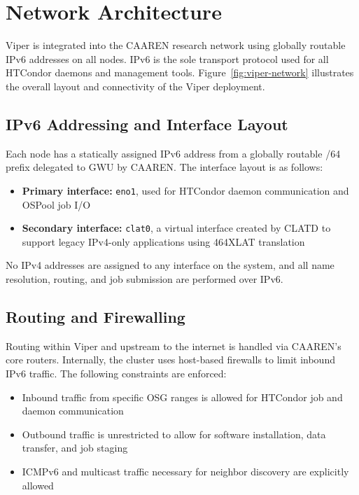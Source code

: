 \documentclass[11pt]{article}
\begin{document}


\section{Network Architecture}

Viper is integrated into the CAAREN research network using globally routable IPv6 addresses on all nodes. IPv6 is the sole transport protocol used for all HTCondor daemons and management tools. Figure~\ref{fig:viper-network} illustrates the overall layout and connectivity of the Viper deployment.

\subsection{IPv6 Addressing and Interface Layout}

Each node has a statically assigned IPv6 address from a globally routable /64 prefix delegated to GWU by CAAREN. The interface layout is as follows:
\begin{itemize}[leftmargin=*,label=--,itemsep=1pt]
    \item \textbf{Primary interface:} \texttt{eno1}, used for HTCondor daemon communication and OSPool job I/O
    \item \textbf{Secondary interface:} \texttt{clat0}, a virtual interface created by CLATD to support legacy IPv4-only applications using 464XLAT translation
\end{itemize}

No IPv4 addresses are assigned to any interface on the system, and all name resolution, routing, and job submission are performed over IPv6.

\subsection{Routing and Firewalling}

Routing within Viper and upstream to the internet is handled via CAAREN’s core routers. Internally, the cluster uses host-based firewalls to limit inbound IPv6 traffic. The following constraints are enforced:
\begin{itemize}[leftmargin=*,label=--,itemsep=1pt]
    \item Inbound traffic from specific OSG ranges is allowed for HTCondor job and daemon communication
    \item Outbound traffic is unrestricted to allow for software installation, data transfer, and job staging
    \item ICMPv6 and multicast traffic necessary for neighbor discovery are explicitly allowed
\end{itemize}
\end{document}

